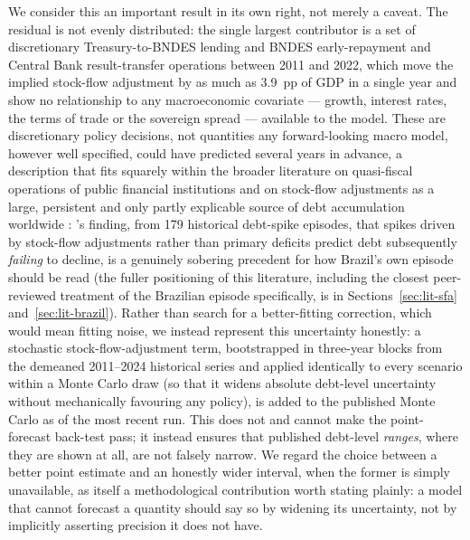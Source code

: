 \documentclass[11pt,a4paper]{article}
\begin{document}
We consider this an important result in its own right, not merely a caveat. The residual is not evenly distributed: the single largest contributor is a set of discretionary Treasury-to-BNDES lending and BNDES early-repayment and Central Bank result-transfer operations between 2011 and 2022, which move the implied stock-flow adjustment by as much as 3.9~pp of GDP in a single year and show no relationship to any macroeconomic covariate --- growth, interest rates, the terms of trade or the sovereign spread --- available to the model. These are discretionary policy decisions, not quantities any forward-looking macro model, however well specified, could have predicted several years in advance, a description that fits squarely within the broader literature on quasi-fiscal operations of public financial institutions \citep{mackenziestella1996} and on stock-flow adjustments as a large, persistent and only partly explicable source of debt accumulation worldwide \citep{weber2012sfa,seiferling2013}: \citet{jaramilloetal2017}'s finding, from 179 historical debt-spike episodes, that spikes driven by stock-flow adjustments rather than primary deficits predict debt subsequently \emph{failing} to decline, is a genuinely sobering precedent for how Brazil's own episode should be read (the fuller positioning of this literature, including the closest peer-reviewed treatment of the Brazilian episode specifically, is in Sections~\ref{sec:lit-sfa} and~\ref{sec:lit-brazil}). Rather than search for a better-fitting correction, which would mean fitting noise, we instead represent this uncertainty honestly: a stochastic stock-flow-adjustment term, bootstrapped in three-year blocks from the demeaned 2011--2024 historical series and applied identically to every scenario within a Monte Carlo draw (so that it widens absolute debt-level uncertainty without mechanically favouring any policy), is added to the published Monte Carlo as of the most recent run. This does not and cannot make the point-forecast back-test pass; it instead ensures that published debt-level \emph{ranges}, where they are shown at all, are not falsely narrow. We regard the choice between a better point estimate and an honestly wider interval, when the former is simply unavailable, as itself a methodological contribution worth stating plainly: a model that cannot forecast a quantity should say so by widening its uncertainty, not by implicitly asserting precision it does not have.
\end{document}
